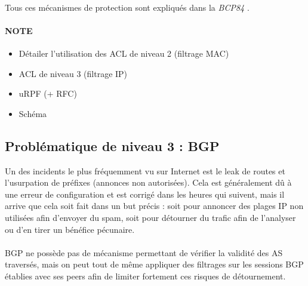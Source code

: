 \paragraph{}
Tous ces mécanismes de protection sont expliqués dans la \emph{BCP84} \cite{fenioux:BCP84}.


\paragraph{NOTE}
\begin{itemize}
\item Détailer l'utilisation des ACL de niveau 2 (filtrage MAC)
\item ACL de niveau 3 (filtrage IP) 
\item uRPF (+ RFC)
\item Schéma
\end{itemize}


\subsection{Problématique de niveau 3 : BGP}

Un des incidents le plus fréquemment vu sur Internet est le leak de routes et l'usurpation de préfixes (annonces non autorisées). Cela est généralement dû à une erreur de configuration et est corrigé dans les heures qui suivent, mais il arrive que cela soit fait dans un but précis : soit pour annoncer des plages IP non utilisées afin d'envoyer du spam, soit pour détourner du trafic afin de l'analyser ou d'en tirer un bénéfice pécunaire.

\paragraph{}
BGP ne possède pas de mécanisme permettant de vérifier la validité des AS traversés, mais on peut tout de même appliquer des filtrages sur les sessions BGP établies avec ses peers afin de limiter fortement ces risques de détournement.

